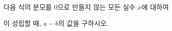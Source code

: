 \hspace*{2mm}\begin{minipage}[t]{\dimexpr\linewidth-2mm\relax}\vspace{0pt}
다음 식의 분모를 $0$으로 만들지 않는 모든 실수 $x$에 대하여\par\smallskip{}\par\smallskip\noindent 이 성립할 때, $a-b$의 값을 구하시오. \end{minipage}
